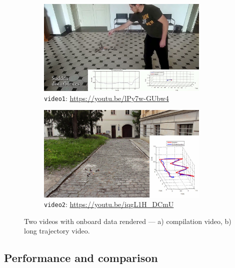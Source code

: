 \begin{figure}[H]
\centering

\begin{subfigure}[b]{0.5\textwidth}
	\centering
	\includegraphics[width=0.9\textwidth]{fig/experiment1_video.jpg}
	\caption{\texttt{video1}: \url{https://youtu.be/lPy7w-GUbw4}}
	\label{fig:video1}
\end{subfigure}%
\begin{subfigure}[b]{0.5\textwidth}
	\centering
	\includegraphics[width=0.9\textwidth]{fig/experiment2_video.jpg}
	\caption{\texttt{video2}: \url{https://youtu.be/iqgL1H_DCmU}}
	\label{fig:video2}
\end{subfigure}

\caption{Two videos with onboard data rendered --- a) compilation video, b) long trajectory video.}
\label{fig:videos}
\end{figure}

\subsection{Performance and comparison}

